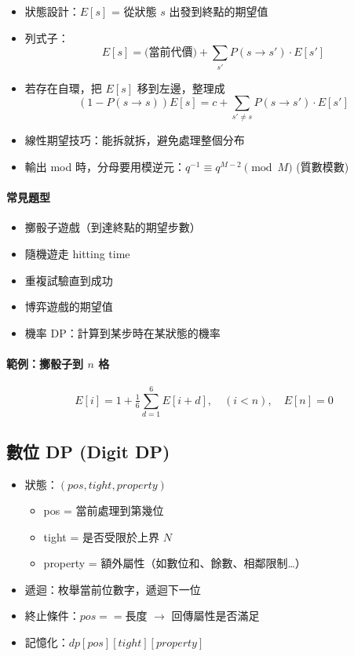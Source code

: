 \documentclass[a4paper,10pt,twocolumn,oneside]{article}
\begin{document}
\begin{itemize}[nolistsep]
    \item 狀態設計：$E[s]$ = 從狀態 $s$ 出發到終點的期望值
    \item 列式子：
    \[
        E[s] = \text{(當前代價)} + \sum_{s'} P(s \to s') \cdot E[s']
    \]
    \item 若存在自環，把 $E[s]$ 移到左邊，整理成
    \[
        (1 - P(s \to s)) E[s] = c + \sum_{s' \neq s} P(s \to s') \cdot E[s']
    \]
    \item 線性期望技巧：能拆就拆，避免處理整個分布
    \item 輸出 mod 時，分母要用模逆元：$q^{-1} \equiv q^{M-2} \pmod{M}$ (質數模數)
\end{itemize}

\paragraph{常見題型}
\begin{itemize}[nolistsep]
    \item 擲骰子遊戲（到達終點的期望步數）
    \item 隨機遊走 hitting time
    \item 重複試驗直到成功
    \item 博弈遊戲的期望值
    \item 機率 DP：計算到某步時在某狀態的機率
\end{itemize}

\paragraph{範例：擲骰子到 $n$ 格}
\[
    E[i] = 1 + \tfrac{1}{6}\sum_{d=1}^6 E[i+d], \quad (i<n), 
    \quad E[n] = 0
\]



\subsection{數位 DP (Digit DP)}

\begin{itemize}[nolistsep]
    \item 狀態：$(pos, tight, property)$
    \begin{itemize}[nolistsep]
        \item pos = 當前處理到第幾位
        \item tight = 是否受限於上界 $N$
        \item property = 額外屬性（如數位和、餘數、相鄰限制…）
    \end{itemize}
    \item 遞迴：枚舉當前位數字，遞迴下一位
    \item 終止條件：$pos == \text{長度}$ $\to$ 回傳屬性是否滿足
    \item 記憶化：$dp[pos][tight][property]$
\end{itemize}
\end{document}
